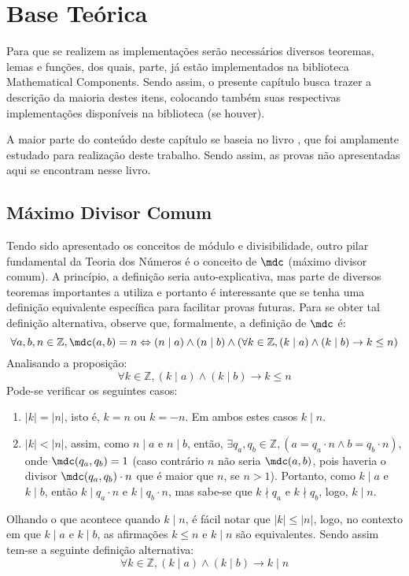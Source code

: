 \chapter{Base Teórica}
\label{cap:base}

Para que se realizem as implementações serão necessários diversos teoremas, lemas e funções, dos quais, parte, já estão implementados na biblioteca Mathematical Components. Sendo assim, o presente capítulo busca trazer a descrição da maioria destes itens, colocando também suas respectivas implementações disponíveis na biblioteca (se houver). 

A maior parte do conteúdo deste capítulo se baseia no livro \cite{book:2399854}, que foi amplamente estudado para realização deste trabalho. Sendo assim, as provas não apresentadas aqui se encontram nesse livro.

\section{Máximo Divisor Comum}
Tendo sido apresentado os conceitos de módulo e divisibilidade, outro pilar fundamental da Teoria dos Números é o conceito de $\mdc$ (máximo divisor comum). A princípio, a definição seria auto-explicativa, mas parte de diversos teoremas importantes a utiliza e portanto é interessante que se tenha uma definição equivalente específica para facilitar provas futuras. Para se obter tal definição alternativa, observe que, formalmente, a definição de $\mdc$ é:
    \begin{equation*}
        \forall a, b, n \in \mathbb{Z},  \mdc(a, b) = n \Leftrightarrow (n \mid a) \land (n \mid b) \land (\forall k \in \mathbb{Z}, (k \mid a) \land (k \mid b) \rightarrow k \leq n)
    \end{equation*}
Analisando a proposição:
    \begin{equation*}
        \forall k \in \mathbb{Z}, (k \mid a) \land (k \mid b) \rightarrow k \leq n
    \end{equation*}
Pode-se verificar os seguintes casos:
    \begin{enumerate}
        \item $|k| = |n|$, isto é, $k = n$ ou $k = -n$. Em ambos estes casos $k \mid n$.

        \item $|k| < |n|$, assim, como $n \mid a$ e $n \mid b$, então, $\exists q_a, q_b \in \mathbb{Z}, (a = q_a \cdot n \land b = q_b \cdot n) $, onde $\mdc(q_a, q_b) = 1$ (caso contrário $n$ não seria $\mdc(a,b)$, pois haveria o divisor $\mdc(q_a, q_b) \cdot n$ que é maior que $n$, se $n > 1$). Portanto, como $k \mid a$ e $k \mid b$, então $k \mid q_a \cdot n$ e $k \mid q_b \cdot n$, mas sabe-se que $k \nmid q_a$ e $k \nmid q_b$, logo, $k \mid n$.
    \end{enumerate}
Olhando o que acontece quando $k \mid n$, é fácil notar que $|k| \leq |n|$, logo, no contexto em que $k \mid a$ e $k \mid b$, as afirmações $k \leq n$ e $k \mid n$ são equivalentes. Sendo assim tem-se a seguinte definição alternativa:
\begin{equation*}
        \forall k \in \mathbb{Z}, (k \mid a) \land (k \mid b) \rightarrow k \mid n
\end{equation*}    

